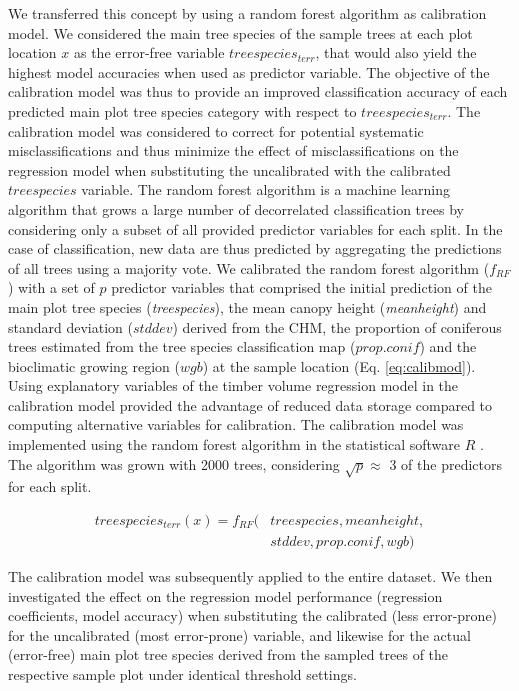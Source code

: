 {We transferred this concept by using a random forest algorithm \citep{breiman2001} as calibration model. We considered the main tree species of the sample trees at each plot location $x$ as the error-free variable $treespecies_{terr}$, that would also yield the highest model accuracies when used as predictor variable. The objective of the calibration model was thus to provide an improved classification accuracy of each predicted main plot tree species category with respect to $treespecies_{terr}$. The calibration model was considered to correct for potential systematic misclassifications and thus minimize the effect of misclassifications on the regression model when substituting the uncalibrated with the calibrated $treespecies$ variable. The random forest algorithm is a machine learning algorithm that grows a large number of decorrelated classification trees by considering only a subset of all provided predictor variables for each split. In the case of classification, new data are thus predicted by aggregating the predictions of all trees using a majority vote. We calibrated the random forest algorithm ($f_{RF}$) with a set of $p$ predictor variables that comprised the initial prediction of the main plot tree species (\textit{treespecies}), the mean canopy height (\textit{meanheight}) and standard deviation ($stddev$) derived from the CHM, the proportion of coniferous trees estimated from the tree species classification map ($prop.conif$) and the bioclimatic growing region ($wgb$) at the sample location (Eq. \ref{eq:calibmod}). Using explanatory variables of the timber volume regression model in the calibration model provided the advantage of reduced data storage compared to computing alternative variables for calibration. The calibration model was implemented using the random forest algorithm \citep{liaw2002} in the statistical software $R$ \citep{R}. The algorithm was grown with 2000 trees, considering $\sqrt{p} \approx$ 3 of the predictors for each split.\par
	
	\begin{equation} \label{eq:calibmod}
	\begin{split}
	treespecies_{terr}(x) = f_{RF}(&treespecies, meanheight, \\
	&stddev, prop.conif, wgb)
	\end{split}
	\end{equation}
	
	The calibration model was subsequently applied to the entire dataset. We then investigated the effect on the regression model performance (regression coefficients, model accuracy) when substituting the calibrated (less error-prone) for the uncalibrated (most error-prone) variable, and likewise for the actual (error-free) main plot tree species derived from the sampled trees of the respective sample plot under identical threshold settings.\par
	
}

